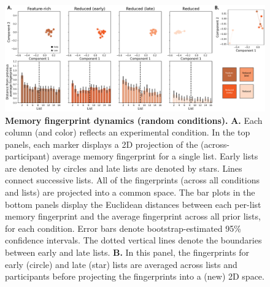 \documentclass{article}
\begin{document}
\begin{figure}[tp] \centering
    \includegraphics[width=\textwidth]{figures/fingerprint_trajectories_random}
    
    \caption{\textbf{Memory fingerprint dynamics (random conditions).}
    \textbf{A.} Each column (and color) reflects an experimental condition. In
    the top panels, each marker displays a 2D projection of the
    (across-participant) average memory fingerprint for a single list. Early
    lists are denoted by circles and late lists are denoted by stars. Lines
    connect successive lists. All of the fingerprints (across all conditions
    and lists) are projected into a common space. The bar plots in the bottom
    panels display the Euclidean distances between each per-list memory
    fingerprint and the average fingerprint across all prior lists, for each
    condition. Error bars denote bootstrap-estimated 95\% confidence intervals.
    The dotted vertical lines denote the boundaries between early and late
    lists. \textbf{B.} In this panel, the fingerprints for early (circle) and
    late (star) lists are averaged across lists and participants before
    projecting the fingerprints into a (new) 2D space.}
    \label{fig:fingerprint-trajectories-random}
    
    \end{figure}
\end{document}
